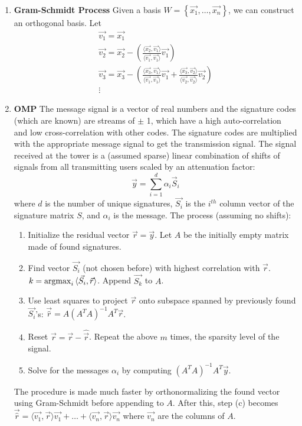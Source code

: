 \documentclass[10pt]{article}
\newcommand{\Est}[1]{\hat{#1}}
\newcommand{\argmax}{\operatornamewithlimits{argmax}}
\begin{document}
\begin{multicols}{2}
\begin{enumerate}
    \item \textbf{Gram-Schmidt Process} Given a basis $W = \left\{\vec{x_1}, \hdots, \vec{x_n} \right\}$, we can construct an orthogonal basis. Let
    \begin{align*}
        \vec{v_1}=\vec{x_1} \\
        \vec{v_2}=\vec{x_2} - \left( \frac{\langle\vec{x_2}, \vec{v_1}\rangle}{\langle \vec{v_1}, \vec{v_1} \rangle}\vec{v_1} \right) \\
        \vec{v_3}=\vec{x_3} - \left( \frac{\langle\vec{x_3}, \vec{v_1}\rangle}{\langle \vec{v_1}, \vec{v_1} \rangle}\vec{v_1} + \frac{\langle\vec{x_3}, \vec{v_2}\rangle}{\langle \vec{v_2}, \vec{v_2} \rangle}\vec{v_2} \right) \\
        \vdots
    \end{align*}
    
    \item \textbf{OMP} The message signal is a vector of real numbers and the signature codes (which are known) are streams of $\pm$ 1, which have a high auto-correlation and low cross-correlation with other codes. The signature codes are multiplied with the appropriate message signal to get the transmission signal. The signal received at the tower is a (assumed sparse) linear combination of shifts of signals from all transmitting users scaled by an attenuation factor:
    $$\vec{y} = \sum_{i=1}^{d} \alpha_i \vec{S}_i$$
    where $d$ is the number of unique signatures, $\vec{S_i}$ is the $i^{th}$ column vector of the signature matrix $S$, and $\alpha_i$ is the message. The process (assuming no shifts):
    \begin{enumerate}
        \item Initialize the residual vector $\vec{r}=\vec{y}$. Let $A$ be the initially empty matrix made of found signatures.
        \item Find vector $\vec{S_i}$ (not chosen before) with highest correlation with $\vec{r}$. $k=\argmax_i{\langle \vec{S_i}, \vec{r} \rangle}$. Append $\vec{S_k}$ to $A$.
        \item Use least squares to project $\vec{r}$ onto subspace spanned by previously found $\vec{S_i}$'s: $\vec{\Est{r}}=A(A^TA)^{-1}A^T\vec{r}$.
        \item Reset $\vec{r}=\vec{r}-\Est{\vec{r}}$. Repeat the above $m$ times, the sparsity level of the signal.
        \item Solve for the messages $\alpha_i$ by computing $(A^TA)^{-1}A^T\vec{y}$.
    \end{enumerate}
    The procedure is made much faster by orthonormalizing the found vector using Gram-Schmidt before appending to $A$. After this, step (c) becomes $\vec{\Est{r}}=\langle \vec{v_1} , \vec{r} \rangle \vec{v_1} + \hdots + \langle \vec{v_n} , \vec{r} \rangle \vec{v_n}$ where $\vec{v_n}$ are the columns of $A$.
    

\end{enumerate}
\end{multicols}
\end{document}
